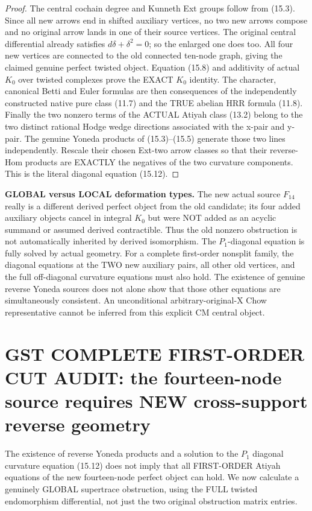 \documentclass[11pt,a4paper]{article}
\begin{document}
\begin{proof}
The central
cochain degree
and Kunneth
Ext groups
follow from
(15.3). Since
all new arrows
end in shifted
auxiliary
vertices, no
two new arrows
compose and no
original arrow
lands in one
of their
source vertices.
The original
central differential
already satisfies
\(d\delta+\delta^2=0\);
so the enlarged
one does too.
All four
new vertices
are connected
to the old
connected
ten-node graph,
giving the
claimed genuine
perfect twisted
object.
Equation (15.8)
and additivity
of actual
\(K_0\) over
twisted
complexes prove
the EXACT
\(K_0\) identity.
The character,
canonical Betti
and Euler
formulas are
then consequences
of the
independently
constructed
native pure
class (11.7)
and the TRUE
abelian
HRR formula
(11.8).
Finally the
two nonzero
terms of the
ACTUAL Atiyah
class (13.2)
belong to the
two distinct
rational
Hodge wedge
directions
associated with
the x-pair
and y-pair.
The genuine
Yoneda products
of (15.3)--(15.5)
generate those
two lines
independently.
Rescale their
chosen Ext-two
arrow classes
so that their
reverse-Hom
products are
EXACTLY
the negatives
of the two
curvature
components.
This is the
literal diagonal
equation (15.12).
\end{proof}

\noindent\textbf{GLOBAL versus LOCAL deformation types.}
The new actual
source \(F_{14}\)
really is a
different
derived perfect
object from
the old candidate;
its four added
auxiliary
objects cancel
in integral
\(K_0\) but
were NOT added
as an acyclic
summand or
assumed derived
contractible.
Thus the old
nonzero
obstruction
is not
automatically
inherited by
derived
isomorphism.
The
\(P_1\)-diagonal
equation is
fully solved
by actual
geometry.
For a complete
first-order
nonsplit family,
the diagonal
equations at
the TWO new
auxiliary
pairs, all
other old
vertices,
and the
full off-diagonal
curvature
equations must
also hold.
The existence
of genuine
reverse
Yoneda sources
does not alone
show that those
other equations
are simultaneously
consistent.
An unconditional
arbitrary-original-X
Chow representative
cannot be
inferred from
this explicit
CM central
object.

\section{GST COMPLETE FIRST-ORDER CUT AUDIT: the fourteen-node source requires NEW cross-support reverse geometry}
The existence
of reverse
Yoneda products
and a solution
to the \(P_1\)
diagonal
curvature
equation
(15.12)
does not imply
that all
FIRST-ORDER
Atiyah equations
of the new
fourteen-node
perfect object
can hold.
We now calculate
a genuinely
GLOBAL
supertrace
obstruction,
using the
FULL twisted
endomorphism
differential,
not just the
two original
obstruction
matrix entries.
\end{document}
